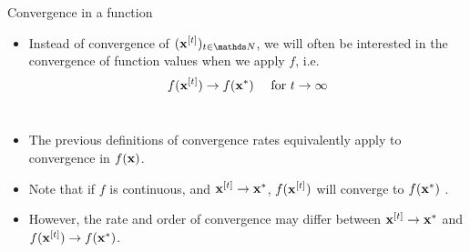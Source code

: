 \documentclass[11pt,compress,t,notes=noshow, xcolor=table]{beamer}
\begin{document}
\begin{vbframe}{Convergence in a function}

\begin{itemize}
  \item Instead of convergence of $(\xv^{[t]})_{t \in\N}$, we will often be interested in the convergence of function values when we apply $f$, i.e.
  $$
  f(\mathbf{x}^{[t]} ) \to f(\mathbf{x}^\ast) \quad \text{ for } t \to \infty
  $$\\[10pt]
  \item The previous definitions of convergence rates equivalently apply to convergence in $f(\mathbf{x})$. \\[10pt]
  \item Note that if $f$ is continuous, and $\mathbf{x}^{[t]} \to \mathbf{x}^\ast$,  $f(\mathbf{x}^{[t]} )$ will converge to $f(\mathbf{x}^\ast)$ .
  \item However, the rate and order of convergence may differ between $\mathbf{x}^{[t]} \to \mathbf{x}^\ast$ and $f(\mathbf{x}^{[t]} ) \to f(\mathbf{x}^\ast)$.
  \end{itemize}

    
\end{vbframe}
\end{document}
